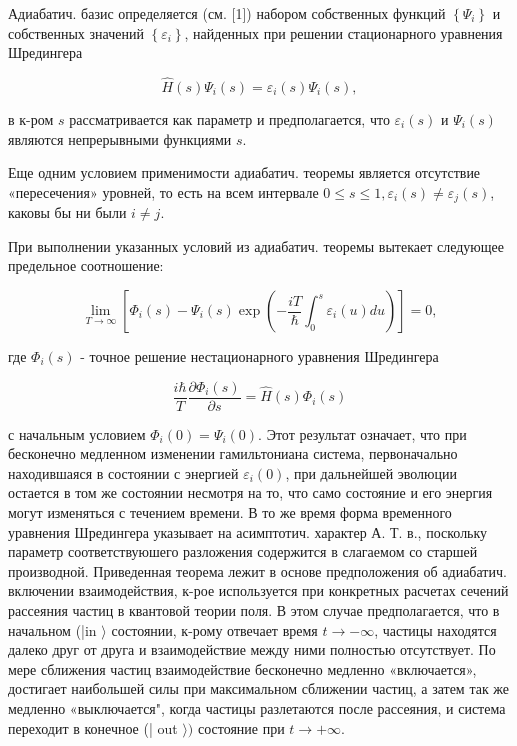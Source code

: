\documentclass[10pt]{article}
\begin{document}
Адиабатич. базис определяется (см. [1]) набором собственных функций $\left\{\Psi_{i}\right\}$ и собственных значений $\left\{\varepsilon_{i}\right\}$, найденных при решении стационарного уравнения Шредингера



\[

\hat{H}(s) \Psi_{i}(s)=\varepsilon_{i}(s) \Psi_{i}(s),

\]



в к-ром $s$ рассматривается как параметр и предполагается, что $\varepsilon_{i}(s)$ и $\Psi_{i}(s)$ являются непрерывными функциями $s$.



Еще одним условием применимости адиабатич. теоремы является отсутствие «пересечения» уровней, то есть на всем интервале $0 \leqslant s \leqslant 1, \varepsilon_{i}(s) \neq \varepsilon_{j}(s)$, каковы бы ни были $i \neq j$.



При выполнении указанных условий из адиабатич. теоремы вытекает следующее предельное соотношение:



\[

\lim _{T \rightarrow \infty}\left[\Phi_{i}(s)-\Psi_{i}(s) \exp \left(-\frac{i T}{\hbar} \int_{0}^{s} \varepsilon_{i}(u) d u\right)\right]=0,

\]



где $\Phi_{i}(s)$ - точное решение нестационарного уравнения Шредингера



\[

\frac{i \hbar}{T} \frac{\partial \Phi_{i}(s)}{\partial s}=\hat{H}(s) \Phi_{i}(s)

\]



с начальным условием $\Phi_{i}(0)=\Psi_{i}(0)$. Этот результат означает, что при бесконечно медленном изменении гамильтониана система, первоначально находившаяся в состоянии с энергией $\varepsilon_{i}(0)$, при дальнейшей эволюции остается в том же состоянии несмотря на то, что само состояние и его энергия могут изменяться с течением времени. В то же время форма временного уравнения Шредингера указывает на асимптотич. характер А. Т. в., поскольку параметр соответствуюшего разложения содержится в слагаемом со старшей производной. Приведенная теорема лежит в основе предположения об адиабатич. включении взаимодействия, к-рое используется при конкретных расчетах сечений рассеяния частиц в квантовой теории поля. В этом случае предполагается, что в начальном (|in $\rangle$ состоянии, к-рому отвечает время $t \rightarrow-\infty$, частицы находятся далеко друг от друга и взаимодействие между ними полностью отсутствует. По мере сближения частиц взаимодействие бесконечно медленно «включается», достигает наибольшей силы при максимальном сближении частиц, а затем так же медленно «выключается", когда частицы разлетаются после рассеяния, и система переходит в конечное (| out $\rangle)$ состояние при $t \rightarrow+\infty$.
\end{document}
